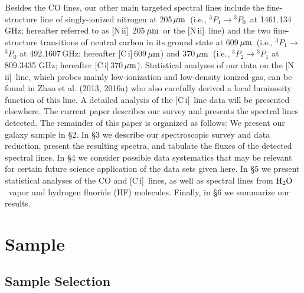 \documentclass[preprint]{aastex}
\newcommand{\um}{\mbox{$\,\mu{\rm m}$}}
\newcommand{\Water}{\mbox{${\rm H}_2{\rm O}$}}
\newcommand{\CI}{[C\,{\sc i}]}
\newcommand{\NII}{\mbox{[N\,{\sc ii}]}}
\begin{document}
Besides the CO lines, our other main targeted spectral lines include the fine-structure 
line of singly-ionized nitrogen at 205\um\ (i.e., $^3P_1 \rightarrow$$^3P_0$\  at 
1461.134\,GHz;  hereafter referred to as \NII\ 205\um\ or the \NII\ line) and 
the two fine-structure transitions of neutral carbon in its ground state at 609\um\
(i.e., $^3P_1 \rightarrow$$^3P_0$ at 492.1607\,GHz; hereafter \CI\,609\um) and 
370\um\ (i.e., $^3P_2 \rightarrow$$^3P_1$ at 809.3435 GHz; hereafter \CI\,370\um).
Statistical analyses of our data on the \NII\ line, which probes 
mainly low-ionization and low-density ionized gas, can be found in Zhao et al. 
(2013, 2016a) who also carefully derived a local luminosity function of this line.
A detailed analysis of the \CI\ line data will be presented elsewhere.   The current
paper describes our survey and presents the spectral lines detected.  
The remainder of this paper is organized as follows: We present our galaxy
sample in \S2.  In \S3 we describe our spectroscopic survey and data reduction, 
present the resulting spectra, and tabulate the fluxes of the detected spectral
lines.  In \S4 we consider possible data systematics that may be relevant for 
certain future science application of the data sets given here.  In \S5 we present
statistical analyses of the CO and \CI\ lines, as well as spectral lines from 
\Water\ vapor and hydrogen fluoride (HF) molecules. Finally, in \S6 we summarize
our results.






\section{Sample} \label{sec2}


\subsection{Sample Selection} \label{sec2.1}
\end{document}
